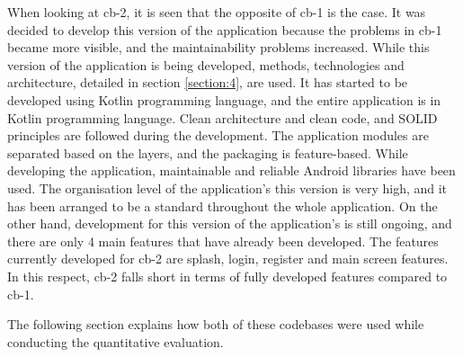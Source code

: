 When looking at cb-2, it is seen that the opposite of cb-1 is the case. It was decided to develop this version of the application because the problems in cb-1 became more visible, and the maintainability problems increased. While this version of the application is being developed, methods, technologies and architecture, detailed in section \ref{section:4}, are used. It has started to be developed using Kotlin programming language, and the entire application is in Kotlin programming language.  Clean architecture and clean code, and SOLID principles are followed during the development. The application modules are separated based on the layers, and the packaging is feature-based. While developing the application, maintainable and reliable Android libraries have been used. The organisation level of the application's this version is very high, and it has been arranged to be a standard throughout the whole application. On the other hand,  development for this version of the application's is still ongoing, and there are only 4 main features that have already been developed. The features currently developed for cb-2 are splash, login, register and main screen features. In this respect, cb-2 falls short in terms of fully developed features compared to cb-1.

The following section explains how both of these codebases were used while conducting the quantitative evaluation.


